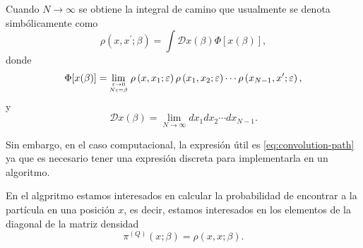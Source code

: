 \documentclass[%
 reprint,
 amsmath,amssymb,
 aps,
 pra,
]{revtex4-2}
\begin{document}
Cuando $N\rightarrow\infty$ se obtiene la integral de camino que usualmente se denota simbólicamente como
\begin{equation}
	\rho\left(x, x^{\prime} ; \beta \right) = \int \mathscr{ D } x(\beta) \Phi[x(\beta)], \label{eq:path-integral-formulation}
\end{equation}
donde
\begin{equation}
	\Phi[x(\beta)]=\!\lim _{\varepsilon \rightarrow 0 \atop N \varepsilon=\beta} \rho\left(x, x_{1} ; \varepsilon\right) \rho\left(x_{1}, x_{2} ; \varepsilon\right) \cdots \rho\left(x_{N-1}, x^{\prime} ; \varepsilon\right),
\end{equation}
y 
\begin{equation}
	\mathscr{D} x(\beta)=\lim _{N \rightarrow \infty} d x_{1} d x_{2} \cdots d x_{N-1}.
\end{equation}

Sin embargo, en el caso computacional, la expresión útil es \ref{eq:convolution-path} ya que es necesario tener una expresión discreta para implementarla en un algoritmo.

En el algpritmo estamos interesados en calcular la probabilidad de encontrar a la partícula en una posición $x$, es decir, estamos interesados en los elementos de la diagonal de la matriz densidad
\begin{equation}
	\pi^{(Q)}(x;\beta) = \rho\left(x, x ; \beta \right). \label{eq:pi-x}
\end{equation}
\end{document}
